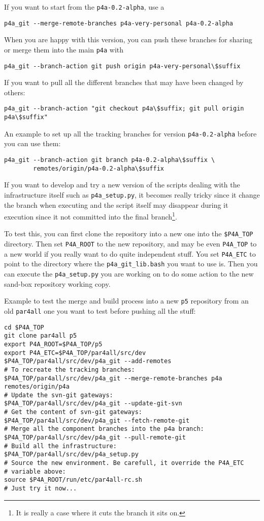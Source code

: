 \documentclass[a4paper]{article}
\begin{document}
If you want to start from the \texttt{p4a-0.2-alpha}, use a
\begin{verbatim}
p4a_git --merge-remote-branches p4a-very-personal p4a-0.2-alpha
\end{verbatim}

When you are happy with this version, you can push these branches for
sharing or merge them into the main \Apfa \texttt{p4a} with
\begin{verbatim}
p4a_git --branch-action git push origin p4a-very-personal\$suffix
\end{verbatim}

If you want to pull all the different \Apfa branches that may have been
changed by others:
\begin{verbatim}
p4a_git --branch-action "git checkout p4a\$suffix; git pull origin p4a\$suffix"
\end{verbatim}

An example to set up all the tracking branches for version
\texttt{p4a-0.2-alpha} before you can use them:
\begin{verbatim}
p4a_git --branch-action git branch p4a-0.2-alpha\$suffix \
        remotes/origin/p4a-0.2-alpha\$suffix
\end{verbatim}
\texttt{}
If you want to develop and try a new version of the scripts dealing with
the \Apfa infrastructure itself such as \verb|p4a_setup.py|, it becomes
really tricky since it change the branch when executing and the script
itself may disappear during it execution since it not committed into the
final branch\footnote{It is really a case where it cuts the branch it sits
on. \smiley}.

To test this, you can first clone the repository into a new one into the
\verb|$P4A_TOP| %
directory. Then set \verb|P4A_ROOT| to the new repository,
and may be even \verb|P4A_TOP| to a new world if you really want to do
quite independent stuff. You set \verb|P4A_ETC| to point to the directory
where the \verb|p4a_git_lib.bash| you want to use is. Then you can execute
the \verb|p4a_setup.py| you are working on to do some action to the new
sand-box repository working copy.

Example to test the merge and build process into a new \texttt{p5}
repository from an old \texttt{par4all} one you want to test before
pushing all the stuff:
\begin{verbatim}
cd $P4A_TOP
git clone par4all p5
export P4A_ROOT=$P4A_TOP/p5
export P4A_ETC=$P4A_TOP/par4all/src/dev
$P4A_TOP/par4all/src/dev/p4a_git --add-remotes
# To recreate the tracking branches:
$P4A_TOP/par4all/src/dev/p4a_git --merge-remote-branches p4a remotes/origin/p4a
# Update the svn-git gateways:
$P4A_TOP/par4all/src/dev/p4a_git --update-git-svn
# Get the content of svn-git gateways:
$P4A_TOP/par4all/src/dev/p4a_git --fetch-remote-git
# Merge all the component branches into the p4a branch:
$P4A_TOP/par4all/src/dev/p4a_git --pull-remote-git
# Build all the infrastructure:
$P4A_TOP/par4all/src/dev/p4a_setup.py
# Source the new environment. Be carefull, it override the P4A_ETC
# variable above:
source $P4A_ROOT/run/etc/par4all-rc.sh
# Just try it now...
\end{verbatim}
\end{document}
